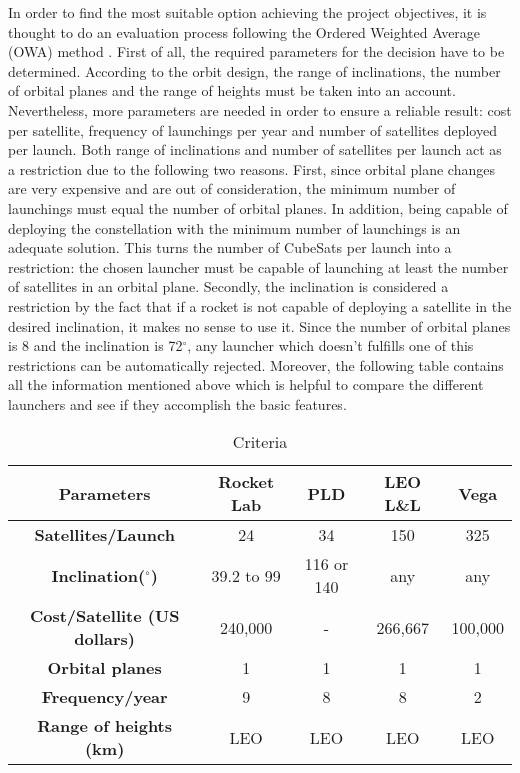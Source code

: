 In order to find the most suitable option achieving the project objectives, it is thought to do an evaluation process following the Ordered Weighted Average (OWA) method . First of all, the required parameters for the decision have to be determined. According to the orbit design, the range of inclinations, the number of orbital planes and the range of heights must be taken into an account. Nevertheless, more parameters are needed in order to ensure a reliable result: cost per satellite, frequency of launchings per year and number of satellites deployed per launch. Both range of inclinations and number of satellites per launch act as a restriction due to the following two reasons. First, since orbital plane changes are very expensive and are out of consideration, the minimum number of launchings must equal the number of orbital planes. In addition, being capable of deploying the constellation with the minimum number of launchings is an adequate solution. This turns the number of CubeSats per launch into a restriction: the chosen launcher must be capable of launching at least the number of satellites in an orbital plane. Secondly, the inclination is considered a restriction by the fact that if a rocket is not capable of deploying a satellite in the desired inclination, it makes no sense to use it. 
Since the number of orbital planes is 8 and the inclination is 72$^{\circ}$, any launcher which doesn't fulfills one of this restrictions can be automatically rejected. 
\newline
 Moreover, the following table contains all the information mentioned above which is helpful to compare the different launchers and see if they accomplish the basic features. 
 \newline	
	\begin{table}[h]
	\begin{center}
	\begin{tabular}{|c|c|c|c|c|}
	\hline
	 \bf{Parameters} & \bf{Rocket Lab} & \bf{PLD} & \bf{LEO L\&L} & \bf{Vega}\\
	\hline 
	\bf{Satellites/Launch} & 24 & 34 & 150 & 325 \\
	\hline 
	\bf{Inclination($^{\circ}$) } & {39.2 to 99} & {116 or 140} & {any} & {any}\\
	\hline 
	 \bf{Cost/Satellite (US dollars)} & 240,000 & - & 266,667 & 100,000\\
	\hline 
	\bf{Orbital planes} & 1 & 1 & 1 & 1 \\
	\hline 
	\bf{Frequency/year} & 9 & 8 & 8 & 2 \\
	\hline 
	\bf{Range of heights (km)} & LEO & LEO & LEO & LEO\\
	\hline
	\end{tabular}
	\end{center}
	\caption{Criteria}
	\end{table} 
